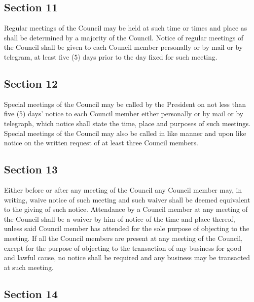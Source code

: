 \documentclass[
]{book}
\begin{document}
\hypertarget{section-11-1}{%
\subsection*{Section 11}\label{section-11-1}}

Regular meetings of the Council may be held at such time or times and place as shall be determined by a majority of the Council. Notice of regular meetings of the Council shall be given to each Council member personally or by mail or by telegram, at least five (5) days prior to the day fixed for such meeting.

\hypertarget{section-12}{%
\subsection*{Section 12}\label{section-12}}

Special meetings of the Council may be called by the President on not less than five (5) days' notice to each Council member either personally or by mail or by telegraph, which notice shall state the time, place and purposes of such meetings. Special meetings of the Council may also be called in like manner and upon like notice on the written request of at least three Council members.

\hypertarget{section-13}{%
\subsection*{Section 13}\label{section-13}}

Either before or after any meeting of the Council any Council member may, in writing, waive notice of such meeting and such waiver shall be deemed equivalent to the giving of such notice. Attendance by a Council member at any meeting of the Council shall be a waiver by him of notice of the time and place thereof, unless said Council member has attended for the sole purpose of objecting to the meeting. If all the Council members are present at any meeting of the Council, except for the purpose of objecting to the transaction of any business for good and lawful cause, no notice shall be required and any business may be transacted at such meeting.

\hypertarget{section-14}{%
\subsection*{Section 14}\label{section-14}}
\end{document}
